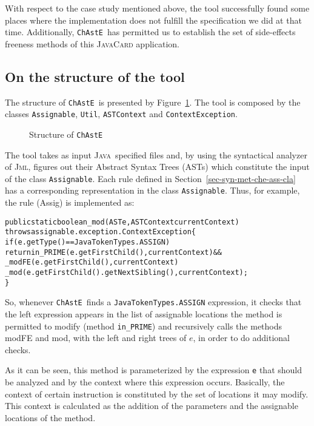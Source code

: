 \documentclass[a4paper]{llncs}
\newcommand{\jml}{\textsc{Jml}}
\newcommand{\java}{\textsc{Java}}
\newcommand{\modtool}{\texttt{ChAstE}}
\begin{document}
With respect to the case study mentioned above, the tool successfully
found some places where the
implementation does not fulfill the specification we did at that
time. Additionally, \modtool\ has permitted us to
establish the set of \mbox{side-effects} freeness methods of this
\textsc{JavaCard} application.




\subsection{On the structure of the tool}
\label{sub-on-the-str-too}
The structure of \modtool\ is presented by
Figure~\ref{fig-str-mod-tool}. The tool is composed by the classes
\texttt{Assignable}, \texttt{Util}, \texttt{ASTContext} and
\texttt{ContextException}. 

\begin{figure}[hbt]
\begin{center}
\end{center}
\caption{Structure of \modtool}
\label{fig-str-mod-tool}
\end{figure}

The tool takes as input
\java~specified files and, by using the syntactical analyzer of \jml,
figures out their Abstract Syntax Trees (ASTs) which constitute the
input of the class \texttt{Assignable}. Each rule defined in
Section~\ref{sec-syn-met-che-ass-cla} has a
corresponding representation in the class \texttt{Assignable}. Thus,
for example, the rule \textsf{(Assig)} is implemented as:

\begin{alltt}
public static boolean _mod(AST e, ASTContext currentContext)
    throws assignable.exception.ContextException\verb!{!
  if(e.getType() == JavaTokenTypes.ASSIGN)
     return in_PRIME(e.getFirstChild(),currentContext) &&
        _modFE(e.getFirstChild(),currentContext)
        _mod(e.getFirstChild().getNextSibling(),currentContext);
\verb!}!
\end{alltt}

So, whenever \modtool\ finds a \texttt{JavaTokenTypes.ASSIGN}
expression, it checks that the left expression appears in the list of
assignable locations the method is permitted to modify (method
\texttt{in\_PRIME}) and recursively calls the methods \textsf{modFE}
and \textsf{mod}, with the left and right trees of $e$, in order to do
additional checks.

As it can be seen, this method is parameterized by the expression
\texttt{e} that should be
analyzed and by the context where this expression occurs. Basically,
the context of certain instruction is constituted by the set of
locations it may modify. This context is calculated as the
addition of the parameters and the assignable locations of the method.
\end{document}
